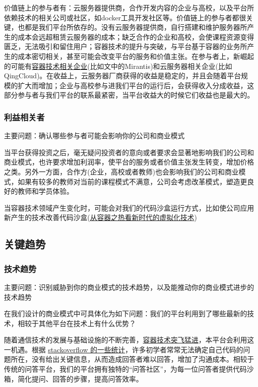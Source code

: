 \documentclass[a4paper]{ctexart}
\begin{document}
价值链上的参与者有：云服务器提供商，合作开发内容的企业与高校，以及平台所依赖技术的相关公司或社区，如docker工具开发社区等。价值链上的参与者都很关键，也都是我们平台所依存的。没有云服务器提供商，自行搭建和维护服务器所产生的成本会远超租赁云服务器的成本；缺乏合作的企业和高校，会使课程资源变得匮乏，无法吸引和留住用户；容器技术的提升与突破，与平台基于容器的业务所产生的成本密切相关，甚至可能会改变平台的服务和价值主张。在参与者上，新崛起的可能有\href{https://www.infoq.cn/article/czBQl3J9QpTfDjJ6Lq6d}{容器技术相关企业}(比如文中的Mirantis)和云服务器相关企业(比如QingCloud)。在收益上，云服务器厂商获得的收益是稳定的，并且会随着平台规模的扩大而增加；企业与高校参与进我们平台的运行后，会获得收入分成收益，这部分参与者与我们平台的联系最紧密，当平台收益大的时候它们收益也是最大的。

\subsubsection{利益相关者}
主要问题：确认哪些参与者可能会影响你的公司和商业模式

当平台获得投资之后，毫无疑问投资者的意向或者要求会显著地影响我们的公司和商业模式，也许要求增加利润率，使平台的服务或者价值主张发生转变，增加价格之类。另外一方面，合作方(企业，高校或者教师)也会影响我们的公司和商业模式，如果有较多的教师对当前的课程模式不满意，公司会考虑改革模式，塑造更良好的教师和学员体验。

当容器技术领域产生变化时，可能会对我们的代码沙盒运行方式，比如使公司应用新产生的技术改善代码沙盒(\href{https://m.sohu.com/n/458230899/}{从容器之热看新时代的虚拟化技术})

\subsection{关键趋势}
\subsubsection{技术趋势}
主要问题：识别威胁到你的商业模式的技术趋势，以及能推动你的商业模式进步的技术趋势

在我们设计的商业模式中可具体化为如下问题：我们的平台利用到了哪些最新的技术，相较于其他平台在技术上有什么优势？

随着通信技术的发展与基础设施的不断完善，\href{https://trends.google.com/trends/explore?date=all&q=docker}{容器技术突飞猛进}，本平台会利用这一机遇。根据 \href{https://meta.stackexchange.com/questions/tagged/question-quality}{stackoverflow 的一些统计}，许多初学者常常无法确定自己代码的问题所在，没有给出关键信息，从而造成回答者难以回答，增加了沟通成本。相较于传统的问答平台，我们的平台拥有独特的“问答社区”，为每一位问答者提供代码沙箱，简化提问、回答的步骤，提高问答效率。
\end{document}
